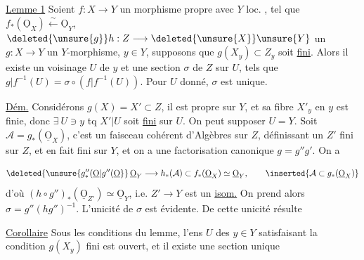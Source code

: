 \uline{Lemme 1} Soient $f:X\longrightarrow Y$ un morphisme propre avec $Y$ loc. , tel que $f_*(\underline{\mathrm O}_X)\xleftarrow{\sim}\underline{\mathrm O}_Y$,  $\deleted{\unsure{g}}h:Z\longrightarrow\deleted{\unsure{X}}\unsure{Y}$ un   $g:X\longrightarrow Y$ un $Y$-morphisme,  $y\in Y$, supposons que $g(X_y)\subset Z_y$ soit \uline{fini}. Alors il existe un voisinage  $U$ de $y$ et une section $\sigma$ de $Z$ sur $U$, tels que $g|f^{-1}(U)=\sigma\circ(f|f^{-1}(U))$. Pour $U$ donné, $\sigma$ est unique.


\uline{Dém.} Considérons $g(X)=X'\subset Z$, il est propre sur $Y$, et sa fibre $X'_y$ en $y$ est finie, donc $\exists\ U\ni y$ tq $X'|U$ soit \uline{fini} sur $U$. On peut supposer $U=Y$. Soit $\mathcal A=g_*(\underline{\mathrm O}_X)$, c'est un faisceau cohérent d'Algèbres sur $Z$, définissant un $Z'$ fini sur $Z$, et en fait fini sur $Y$, et on a une factorisation canonique $g=g''g'$. On a

\[
\deleted{\unsure{g''_{*}(\underline{\mathrm O}|g''(\underline{\mathrm O}}}\,
\underline{\mathrm O}_{Y}\longrightarrow h_*(\mathcal A)
\subset f_*(\underline{\mathrm O}_X)\simeq\underline{\mathrm O}_Y,
\qquad\inserted{\mathcal A\subset g_*(\underline{\mathrm O}_X)}
\]
d'où $(h\circ g'')_*(\underline{\mathrm O}_{Z'})\simeq\underline{\mathrm O}_Y$, i.e. $Z'\longrightarrow Y$ est un \uline{isom.} On prend alors $\sigma=g''(hg'')^{-1}$. L'unicité  de $\sigma$ est évidente. De cette unicité résulte

\uline{Corollaire} Sous les conditions du lemme, l'ens $U$ des $y\in Y$ satisfaisant la condition $g(X_y)$ fini est ouvert, et il existe une section unique
